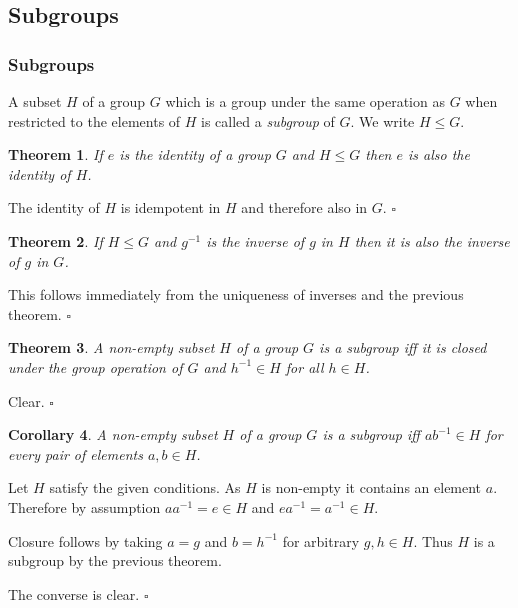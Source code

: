 \documentclass[10pt]{article}
\newtheorem{theorem}{Theorem}[section]
\newtheorem{corollary}[theorem]{Corollary}
\newenvironment{proof}[1][Proof]{\begin{trivlist}
\item[\hskip \labelsep {\itshape #1}]}{\end{trivlist}}
\newenvironment{definition}[1][Definition]{\begin{trivlist}
\item[\hskip \labelsep {\bfseries #1}]}{\end{trivlist}}
\begin{document}
\subsection{Subgroups}

\subsubsection{Subgroups}

\begin{definition}
A subset $H$ of a group $G$ which is a group under the same operation as $G$ when restricted to the elements of $H$ is called a \emph{subgroup} of $G$. We write $H \leq G$.
\end{definition}

\begin{theorem}
If $e$ is the identity of a group $G$ and $H \leq G$ then $e$ is also the identity of $H$.
\end{theorem}

\begin{proof}
The identity of $H$ is idempotent in $H$ and therefore also in $G$. $\square$
\end{proof}

\begin{theorem}
If $H \leq G$ and $g^{-1}$ is the inverse of $g$ in $H$ then it is also the inverse of $g$ in $G$.
\end{theorem}

\begin{proof}
This follows immediately from the uniqueness of inverses and the previous theorem. $\square$
\end{proof}

\begin{theorem}
A non-empty subset $H$ of a group $G$ is a subgroup iff it is closed under the group operation of $G$ and $h^{-1} \in H$ for all $h \in H$.
\end{theorem}

\begin{proof}
Clear. $\square$
\end{proof}

\begin{corollary} \label{subgroup}
A non-empty subset $H$ of a group $G$ is a subgroup iff $ab^{-1} \in H$ for every pair of elements $a, b \in H$.
\end{corollary}

\begin{proof}
Let $H$ satisfy the given conditions. As $H$ is non-empty it contains an element $a$. Therefore by assumption $aa^{-1} = e \in H$ and $ea^{-1} = a^{-1} \in H$.

Closure follows by taking $a = g$ and $b = h^{-1}$ for arbitrary $g, h \in H$. Thus $H$ is a subgroup by the previous theorem.

The converse is clear. $\square$
\end{proof}
\end{document}
